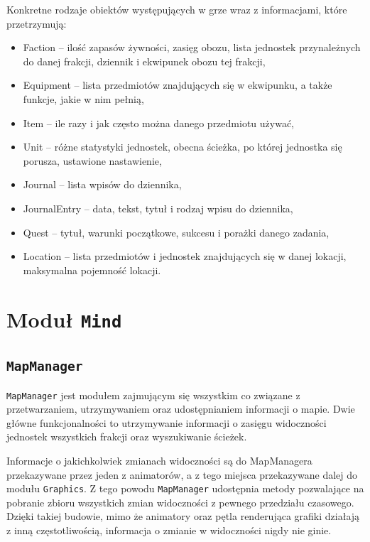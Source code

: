 \documentclass[licencjacka]{pracamgr}
\begin{document}
    Konkretne rodzaje obiektów występujących w grze wraz z informacjami, które przetrzymują:
    \begin{itemize}
      \item Faction -- ilość zapasów żywności, zasięg obozu, lista jednostek przynależnych do danej
	frakcji, dziennik i ekwipunek obozu tej frakcji,
      \item Equipment -- lista przedmiotów znajdujących się w ekwipunku, a także funkcje, jakie w nim pełnią,
      \item Item --  ile razy i jak często można danego przedmiotu używać,
      \item Unit -- różne statystyki jednostek, obecna ścieżka, po której jednostka się porusza, ustawione nastawienie,
      \item Journal -- lista wpisów do dziennika,
      \item JournalEntry -- data, tekst, tytuł i rodzaj wpisu do dziennika,
      \item Quest -- tytuł, warunki początkowe, sukcesu i porażki danego zadania,
      \item Location -- lista przedmiotów i jednostek znajdujących się w danej lokacji, maksymalna pojemność lokacji.
    \end{itemize}

  \section{Moduł \texttt{Mind}}
    \subsection{\texttt{MapManager}}
      \texttt{MapManager} jest modułem zajmującym się wszystkim co związane z przetwarzaniem, utrzymywaniem oraz udostępnianiem
      informacji o mapie. Dwie główne funkcjonalności to utrzymywanie informacji o zasięgu widoczności jednostek wszystkich
      frakcji oraz wyszukiwanie ścieżek.

      Informacje o jakichkolwiek zmianach widoczności są do MapManagera przekazywane przez jeden z animatorów, a z tego miejsca
      przekazywane dalej do modułu \texttt{Graphics}. Z tego powodu \texttt{MapManager} udostępnia metody pozwalające na pobranie
      zbioru wszystkich zmian widoczności z pewnego przedziału czasowego. Dzięki takiej budowie, mimo że animatory oraz pętla 
      renderująca grafiki działają z inną częstotliwością, informacja o zmianie w widoczności nigdy nie ginie.
\end{document}
